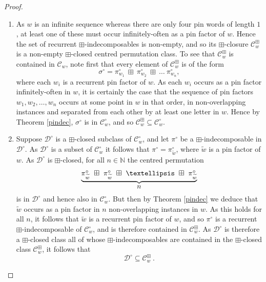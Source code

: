 \documentclass[11pt,a4paper]{article}
\theoremstyle{definition}
\begin{document}
\begin{proof}
\begin{enumerate}
\item As $w$ is an infinite sequence whereas there are only four pin words of length $1$, at least one of these must occur infinitely-often as a pin factor of $w$. Hence the set of recurrent $\boxplus$-indecomposables is non-empty, and so its $\boxplus$-closure $\mathcal{C}^{\boxplus}_{w}$ is a non-empty $\boxplus$-closed centred permutation class. To see that $\mathcal{C}^{\boxplus}_{w}$ is contained in $\mathcal{C}_{w}$, note first that every element of $\mathcal{C}^{\boxplus}_{w}$ is of the form
\[
\sigma^{\circ} = \pi^{\circ}_{w_{1}} \ \boxplus \ \pi^{\circ}_{w_{2}} \ \boxplus \ \dots \ \pi^{\circ}_{w_{n}},
\]
where each $w_{i}$ is a recurrent pin factor of $w$. As each $w_{i}$ occurs as a pin factor infinitely-often in $w$, it is certainly the case that the sequence of pin factors $w_{1}, w_{2}, \dots, w_{n}$ occurs at some point in $w$ in that order, in non-overlapping instances and separated from each other by at least one letter in $w$. Hence by Theorem \ref{pindec}, $\sigma^{\circ}$ is in $\mathcal{C}^{\circ}_{w}$, and so $\mathcal{C}^{\boxplus}_{w} \subseteq \mathcal{C}^{\circ}_{w}$.
\item Suppose $\mathcal{D}^{\circ}$ is a $\boxplus$-closed subclass of $\mathcal{C}^{\circ}_{w}$, and let $\pi^{\circ}$ be a $\boxplus$-indecomposable in $\mathcal{D}^{\circ}$. As $\mathcal{D}^{\circ}$ is a subset of $\mathcal{C}^{\circ}_{w}$ it follows that $\pi^{\circ} = \pi^{\circ}_{\widetilde{w}}$, where $\widetilde{w}$ is a pin factor of $w$. As $\mathcal{D}^{\circ}$ is $\boxplus$-closed, for all $n \in \mathbb{N}$ the centred permutation
\[
\underbrace{\mbox{$\pi^{\circ}_{\widetilde{w}} \ \boxplus \ \pi^{\circ}_{\widetilde{w}} \ \boxplus \ \ldots \ \boxplus \ \pi^{\circ}_{\widetilde{w}}$}}_{\mbox{{\small $n$}}}
\]
is in $\mathcal{D}^{\circ}$ and hence also in $\mathcal{C}^{\circ}_{w}$. But then by Theorem \ref{pindec} we deduce that $\widetilde{w}$ occurs as a pin factor in $n$ non-overlapping instances in $w$. As this holds for all $n$, it follows that $\widetilde{w}$ is a recurrent pin factor of $w$, and so $\pi^{\circ}$ is a recurrent $\boxplus$-indecomposable of $\mathcal{C}^{\circ}_{w}$, and is therefore contained in $\mathcal{C}^{\boxplus}_{w}$. As $\mathcal{D}^{\circ}$ is therefore a $\boxplus$-closed class all of whose $\boxplus$-indecomposables are contained in the $\boxplus$-closed class $\mathcal{C}^{\boxplus}_{w}$, it follows that
\[
\mathcal{D}^{\circ} \subseteq \mathcal{C}^{\boxplus}_{w} \ .
\]
\end{enumerate}
\end{proof}
\end{document}
